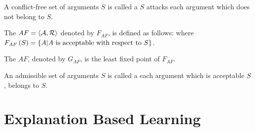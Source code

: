 \begin{defi}
A conflict-free set of arguments $S$ is called a  \iffTx{} $S$ attacks each argument which does not belong to $S$.
\cite{conf/ijcai/Dung93}
\end{defi}

\begin{defi}
The  $AF=\left\langle \mathcal{A},\mathcal{R}\right\rangle$ denoted by $F_{AF}$, is defined as follows:  where $F_{AF}\left(S\right)=\left\{ A|A\mbox{ is acceptable with respect to{} }S\right\}$.
\cite{conf/ijcai/Dung93}
\end{defi}

\begin{defi}
The  $AF$, denoted by $G_{AF}$, is the least fixed point of $F_{AF}$.
\cite{conf/ijcai/Dung93}
\end{defi}

\begin{defi}
An admissible set of arguments $S$ is called a  \iffTx{} each argument which is acceptable \wrtTx{} $S$, belongs to $S$.
\cite{conf/ijcai/Dung93}
\end{defi}

\section{Explanation Based Learning}

